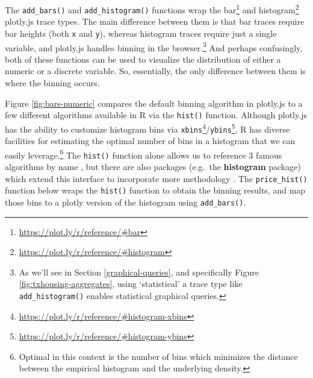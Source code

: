 \documentclass[
  12pt,
]{krantz}
\renewcommand{\href}[2]{#2\footnote{\url{#1}}}
\begin{document}
The \texttt{add\_bars()} and \texttt{add\_histogram()} functions wrap the \href{https://plot.ly/r/reference/\#bar}{bar} and \href{https://plot.ly/r/reference/\#histogram}{histogram} plotly.js trace types. The main difference between them is that bar traces require bar heights (both \texttt{x} and \texttt{y}), whereas histogram traces require just a single variable, and plotly.js handles binning in the browser.\footnote{As we'll see in Section \ref{graphical-queries}, and specifically Figure \ref{fig:txhousing-aggregates}, using `statistical' a trace type like \texttt{add\_histogram()} enables statistical graphical queries.} And perhaps confusingly, both of these functions can be used to visualize the distribution of either a numeric or a discrete variable. So, essentially, the only difference between them is where the binning occurs.

Figure \ref{fig:bars-numeric} compares the default binning algorithm in plotly.js to a few different algorithms available in R via the \texttt{hist()} function. Although plotly.js has the ability to customize histogram bins via \href{https://plot.ly/r/reference/\#histogram-xbins}{\texttt{xbins}}/\href{https://plot.ly/r/reference/\#histogram-ybins}{\texttt{ybins}}, R has diverse facilities for estimating the optimal number of bins in a histogram that we can easily leverage.\footnote{Optimal in this context is the number of bins which minimizes the distance between the empirical histogram and the underlying density.} The \texttt{hist()} function alone allows us to reference 3 famous algorithms by name \citep{Sturges, FD, hist-scott}, but there are also packages (e.g.~the \textbf{histogram} package) which extend this interface to incorporate more methodology \citep{histogram}. The \texttt{price\_hist()} function below wraps the \texttt{hist()} function to obtain the binning results, and map those bins to a plotly version of the histogram using \texttt{add\_bars()}.
\end{document}
